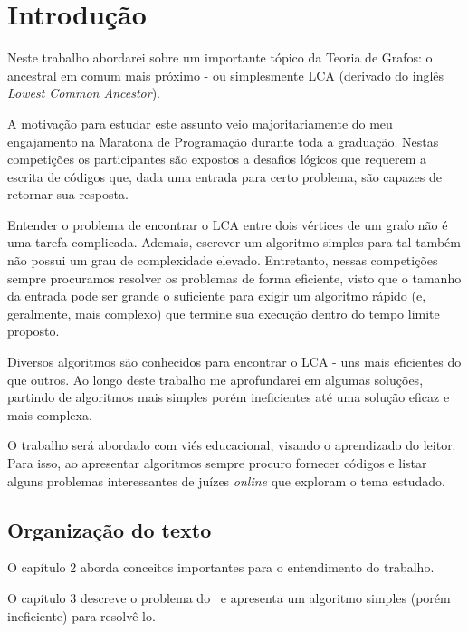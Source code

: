 \chapter{Introdução}
\label{cap:introducao}


Neste trabalho abordarei sobre um importante tópico da Teoria de Grafos: o ancestral 
em comum mais próximo - ou simplesmente LCA (derivado do inglês \emph{Lowest Common 
Ancestor}).

A motivação para estudar este assunto veio majoritariamente do meu engajamento na 
Maratona de Programação durante toda a graduação. Nestas competições os participantes 
são expostos a desafios lógicos que requerem a escrita de códigos que, dada uma 
entrada para certo problema, são capazes de retornar sua resposta.

Entender o problema de encontrar o LCA entre dois vértices de um grafo não é uma 
tarefa complicada. Ademais, escrever um algoritmo simples para tal também não possui 
um grau de complexidade elevado. Entretanto, nessas competições sempre procuramos 
resolver os problemas de forma eficiente, visto que o tamanho da entrada pode ser 
grande o suficiente para exigir um algoritmo rápido (e, geralmente, mais complexo) 
que termine sua execução dentro do tempo limite proposto.

Diversos algoritmos são conhecidos para encontrar o LCA - uns mais eficientes do 
que outros. Ao longo deste trabalho me aprofundarei em algumas soluções, partindo 
de algoritmos mais simples porém ineficientes até uma solução eficaz e mais complexa.

O trabalho será abordado com viés educacional, visando o aprendizado do leitor. 
Para isso, ao apresentar algoritmos sempre procuro fornecer códigos e listar 
alguns problemas interessantes de juízes \emph{online} que exploram o tema estudado.


\section{Organização do texto}

O capítulo 2 aborda conceitos importantes para o entendimento do trabalho.

\vspace{0.2cm}

O capítulo 3 descreve o problema do \LCA\ e apresenta um algoritmo simples (porém ineficiente) para resolvê-lo.

